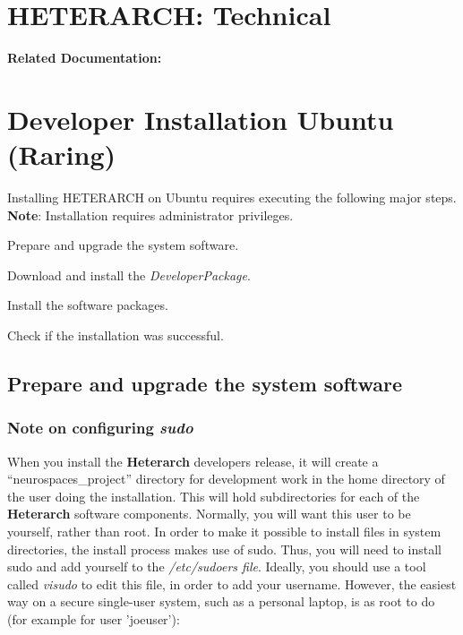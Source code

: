 \documentclass[12pt]{article}
\begin{document}
\section*{HETERARCH: Technical}

{\bf Related Documentation:} \\

\section*{Developer Installation Ubuntu (Raring)}

Installing HETERARCH on Ubuntu requires executing the following major steps. {\bf Note}: Installation requires administrator privileges.
\begin{description} 
   \item Prepare and upgrade the system software.
   \item Download and install the {\it DeveloperPackage}.
   \item Install the software packages.
   \item Check if the installation was successful. 
\end{description}

\subsection*{Prepare and upgrade the system software}

\subsubsection*{Note on configuring {\emph{sudo}}}

When you install the {\bf \small{Heterarch}} developers release, it will create a
``neurospaces\_project'' directory for development work in the home
directory of the user doing the installation.  This will hold
subdirectories for each of the  {\bf \small Heterarch} software components.  Normally, you
will want this user to be yourself, rather than root.  In order to
make it possible to install files in system directories, the install
process makes use of sudo.  Thus, you will need to install sudo and
add yourself to the {\it /etc/sudoers file}.  Ideally, you should use
a tool called {\it visudo} to edit this file, in order to add your
username.  However, the easiest way on a secure single-user system,
such as a personal laptop, is as root to do (for example for user
'joeuser'):
\end{document}
